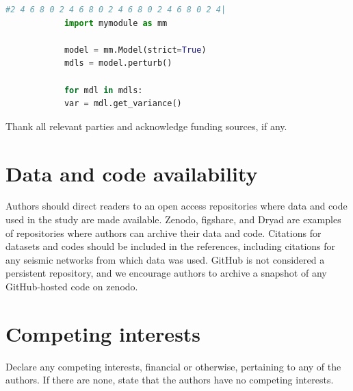 \documentclass[]{seismica}
\begin{document}
		\begin{lstlisting}[caption=Example use of \code{Model}, label=code, language=Python]
			#2 4 6 8 0 2 4 6 8 0 2 4 6 8 0 2 4 6 8 0 2 4|
			import mymodule as mm
			
			model = mm.Model(strict=True)
			mdls = model.perturb()
			
			for mdl in mdls:
			var = mdl.get_variance()
		\end{lstlisting}
		
		\begin{acknowledgements}
			Thank all relevant parties and acknowledge funding sources, if any.
		\end{acknowledgements}
		
		\section*{Data and code availability}
		Authors should direct readers to an open access repositories where data and code used in the study are made available. Zenodo, figshare, and Dryad are examples of repositories where authors can archive their data and code. Citations for datasets and codes should be included in the references, including citations for any seismic networks from which data was used. GitHub is not considered a persistent repository, and we encourage authors to archive a snapshot of any GitHub-hosted code on zenodo.
		
		\section*{Competing interests}
		Declare any competing interests, financial or otherwise, pertaining to any of the authors. If there are none, state that the authors have no competing interests.
		
		
		
	
\end{document}
